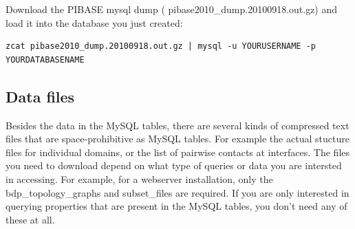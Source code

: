 \documentclass[11pt]{article}
\begin{document}
Download the PIBASE mysql dump ( pibase2010\_dump.20100918.out.gz) and load it into the database you just created:

\begin{verbatim}
zcat pibase2010_dump.20100918.out.gz | mysql -u YOURUSERNAME -p YOURDATABASENAME
\end{verbatim}


\subsection{Data files}

Besides the data in the MySQL tables, there are several kinds of compressed text files that are space-prohibitive as MySQL tables. For example the actual stucture files for individual domains, or the list of pairwise contacts at interfaces. The files you need to download depend on what type of queries or data you are intersted in accessing. For example, for a webserver installation, only the bdp\_topology\_graphs and subset\_files are required. If you are only interested in querying properties that are present in the MySQL tables, you don't need any of these at all.
\end{document}
